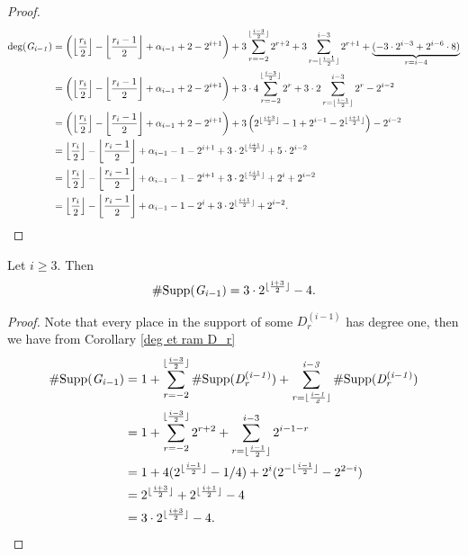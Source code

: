 \documentclass[10pt]{article}
\begin{document}
\begin{proof}
\begin{align*}
\rm{deg}(\it G_{i-1}) &= \left( \left \lfloor \frac{r_i}{2}\right\rfloor - \left \lfloor \frac{r_i-1}{2}\right\rfloor + \alpha_{i-1} +2-2^{i+1}\right) + 3\sum\limits_{r=-2}^{\lfloor \frac{i-3}{2}\rfloor} 2^{r+2} +3 \sum\limits_{r=\lfloor \frac{i-1}{2}\rfloor}^{i-3} 2^{r+1} + \underbrace{(-3\cdot 2^{i-3} + 2^{i-6}\cdot 8)}_{r=i-4} \\
&= \left( \left \lfloor \frac{r_i}{2}\right\rfloor - \left \lfloor \frac{r_i-1}{2}\right\rfloor + \alpha_{i-1} +2-2^{i+1}\right) + 3 \cdot 4\sum\limits_{r=-2}^{\lfloor \frac{i-3}{2}\rfloor} 2^{r} + 3 \cdot 2 \sum\limits_{r=\lfloor \frac{i-1}{2}\rfloor}^{i-3} 2^r - 2^{i-2} \\
&= \left( \left \lfloor \frac{r_i}{2}\right\rfloor - \left \lfloor \frac{r_i-1}{2}\right\rfloor + \alpha_{i-1} +2-2^{i+1}\right) + 3 \left( 2^{\lfloor \frac{i+3}{2} \rfloor}-1 + 2^{i-1} - 2^{\lfloor \frac{i+1}{2}\rfloor} \right) - 2^{i-2} \\
&= \left \lfloor \frac{r_i}{2}\right\rfloor - \left \lfloor \frac{r_i-1}{2}\right\rfloor + \alpha_{i-1} -1-2^{i+1} + 3 \cdot 2^{\lfloor \frac{i+1}{2}\rfloor} + 5 \cdot 2^{i-2} \\
&=\left \lfloor \frac{r_i}{2}\right\rfloor - \left \lfloor \frac{r_i-1}{2}\right\rfloor + \alpha_{i-1} -1-2^{i+1} + 3 \cdot 2^{\lfloor \frac{i+1}{2}\rfloor} + 2^i + 2^{i-2} \\
&=\left \lfloor \frac{r_i}{2}\right\rfloor - \left \lfloor \frac{r_i-1}{2}\right\rfloor + \alpha_{i-1} -1-2^{i} + 3 \cdot 2^{\lfloor \frac{i+1}{2}\rfloor} + 2^{i-2}.
\end{align*}
\end{proof}

\s

\begin{lemma} \label{supp Gi}
Let $i \geq 3$. Then 
\[ \#\rm{Supp} (\it{G}_{i- \rm 1}) = \rm 3 \cdot 2^{\lfloor \frac{i+3}{2}\rfloor} - 4. \]
\end{lemma} 

\s

\begin{proof}
Note that every place in the support of some $D_r^{(i-1)}$ has degree one, then we have from Corollary \ref{deg et ram D_r}
\begin{align*}
\#\rm{Supp} (\it{G}_{i- \rm 1}) & = 1 + \sum\limits_{r=-2}^{\lfloor \frac{i-3}{2}\rfloor} \#\rm{Supp} (\it{D_r^{(i-1)}})  + \sum\limits_{r=\lfloor \frac{i-1}{2}\rfloor}^{i-3} \#\rm{Supp} (\it{D_r^{(i-1)}}) \\
& = 1 + \sum\limits_{r=-2}^{\lfloor \frac{i-3}{2}\rfloor} 2^{r+2}  + \sum\limits_{r=\lfloor \frac{i-1}{2}\rfloor}^{i-3} 2^{i-1-r} \\
&= 1 + 4(2^{\lfloor \frac{i-1}{2}\rfloor}-1/4) + 2^i(2^{-\lfloor \frac{i-1}{2} \rfloor}- 2^{2-i}) \\
&= 2^{\lfloor \frac{i+3}{2}\rfloor} + 2^{\lfloor \frac{i+1}{2}\rfloor}-4 \\
&= 3 \cdot 2^{\lfloor \frac{i+3}{2}\rfloor} - 4.
\end{align*}
\end{proof}
\end{document}
